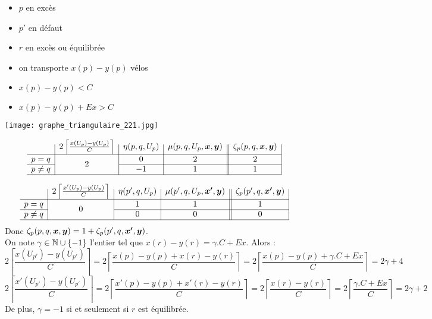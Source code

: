 \begin{minipage}{0.5\linewidth}
\begin{itemize}
\item $p$ en excès
\item $p'$ en défaut
\item $r$ en excès ou équilibrée
\item on transporte $x(p)-y(p)$ vélos
\item $x(p)-y(p) < C$
\item $x(p) - y(p) + Ex > C$
\end{itemize}
\end{minipage}
\begin{minipage}{0.5\linewidth}
\begin{center}
\texttt{[image: graphe\_triangulaire\_221.jpg]}
\end{center}
\end{minipage}

\begin{gather*}
  \begin{array}{c|c|c|c||c|}
    & 2 \left\lceil \frac{x(U_p)-y(U_p)}{C} \right\rceil
    & \eta(p,q,U_p)
    & \mu(p,q,U_p,\bs{x},\bs{y})
    & \zeta_p(p,q,\bs{x},\bs{y})
    \\ \hline
    p=q
    & \multirow{2}{*}{$2$}
    & 0
    & 2
    & 2
    \\ \cline{1-1}\cline{3-5}
    p \ne q
    &
    & -1
    & 1
    & 1
    \\ \hline
  \end{array}
\end{gather*}

\begin{gather*}
  \begin{array}{c|c|c|c||c|}
    & 2 \left\lceil \frac{x'(U_p)-y(U_p)}{C} \right\rceil
    & \eta(p',q,U_p)
    & \mu(p',q,U_p,\bs{x'},\bs{y})
    & \zeta_p(p',q,\bs{x'},\bs{y})
    \\ \hline
    p=q
    & \multirow{2}{*}{$0$}
    & 1
    & 1
    & 1
    \\ \cline{1-1}\cline{3-5}
    p \ne q
    &
    & 0
    & 0
    & 0
    \\ \hline
  \end{array}
\end{gather*}
Donc $\zeta_p(p,q,\boldsymbol{x},\boldsymbol{y}) = 1 + \zeta_p(p',q,\boldsymbol{x'},\boldsymbol{y})$.
\\

On note $\gamma \in \mathbb{N} \cup \{-1\}$ l'entier tel que $x(r)-y(r)=\gamma. C + Ex$. Alors :
\[
2 \left\lceil \frac{x(U_{p'})-y(U_{p'})}{C} \right\rceil
= 2 \left\lceil \frac{x(p)-y(p)+x(r)-y(r)}{C} \right\rceil
= 2 \left\lceil \frac{x(p)-y(p)+\gamma. C + Ex}{C} \right\rceil
= 2\gamma + 4
\]
\[
2 \left\lceil \frac{x'(U_{p'})-y(U_{p'})}{C} \right\rceil
= 2 \left\lceil \frac{x'(p)-y(p)+x'(r)-y(r)}{C} \right\rceil
= 2 \left\lceil \frac{x(r)-y(r)}{C} \right\rceil
= 2 \left\lceil \frac{\gamma. C + Ex}{C} \right\rceil
= 2\gamma + 2
\]
De plus, $\gamma = -1$ si et seulement si $r$ est équilibrée.

